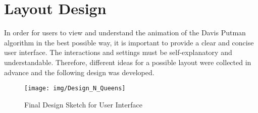 \section{Layout Design}
In order for users to view and understand the animation of the Davis Putman algorithm in the best possible way, it is important to provide a clear and concise user interface. The interactions and settings must be self-explanatory and understandable. Therefore, different ideas for a possible layout were collected in advance and the following design was developed. 
\begin{figure}[h]
  \centering
  \texttt{[image: img/Design\_N\_Queens]}
  \caption{Final Design Sketch for User Interface}
  \label{fig:design}
\end{figure}
